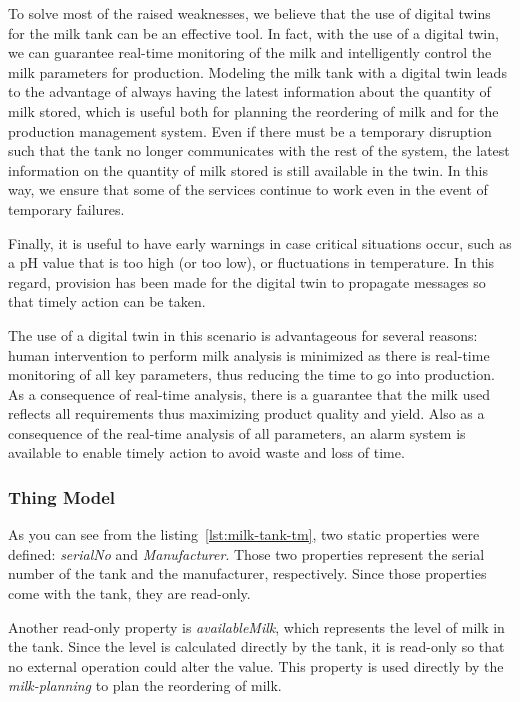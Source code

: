 To solve most of the raised weaknesses, we believe that the use of digital twins for the milk tank can be an effective tool.
In fact, with the use of a digital twin, we can guarantee real-time monitoring of the milk and intelligently control the milk parameters for 
production.
Modeling the milk tank with a digital twin leads to the advantage of always having the latest information about the quantity of milk stored,
which is useful both for planning the reordering of milk and for the production management system.
Even if there must be a temporary disruption such that the tank no longer communicates with the rest of the system,
the latest information on the quantity of milk stored is still available in the twin.
In this way, we ensure that some of the services continue to work even in the event of temporary failures.

Finally, it is useful to have early warnings in case critical situations occur, such as a pH value that is too high (or too low), or fluctuations in
temperature.
In this regard, provision has been made for the digital twin to propagate messages so that timely action can be taken.

The use of a digital twin in this scenario is advantageous for several reasons: human intervention to perform milk analysis is minimized as there is
real-time monitoring of all key parameters, thus reducing the time to go into production.
As a consequence of real-time analysis, there is a guarantee that the milk used reflects all requirements thus maximizing product quality and yield.
Also as a consequence of the real-time analysis of all parameters, an alarm system is available to enable timely action to avoid waste and loss of time.

\subsubsection{Thing Model}



As you can see from the listing~\ref{lst:milk-tank-tm}, two static properties were defined: \textit{serialNo} and \textit{Manufacturer}.
Those two properties represent the serial number of the tank and the manufacturer, respectively.
Since those properties come with the tank, they are read-only.

Another read-only property is \textit{availableMilk}, which represents the level of milk in the tank. Since the level is calculated directly by the
tank, it is read-only so that no external operation could alter the value. This property is used directly by the \textit{milk-planning} to
plan the reordering of milk.

